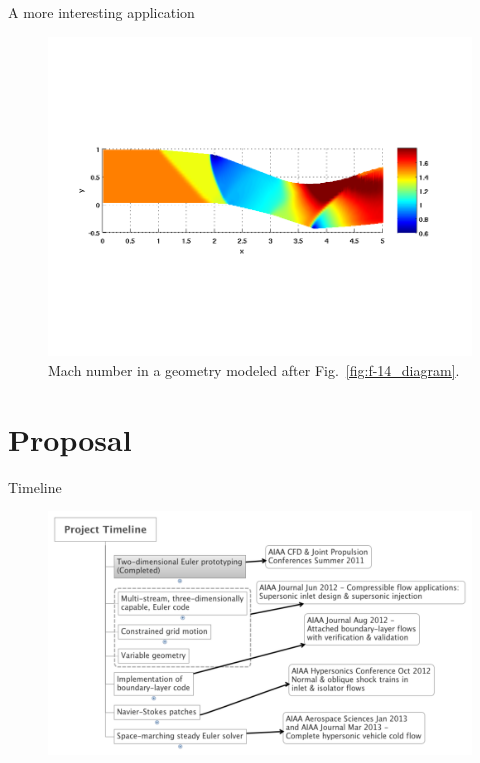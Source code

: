\documentclass{beamer}
\begin{document}
\begin{frame}{A more interesting application}
\begin{figure}[htbp]
   \centering
   \includegraphics[width=\textwidth]{F_14_filmstrip_5clean.pdf}
   \caption[Mach Number in F-14 Inlet]{Mach number in a geometry modeled after Fig.~\ref{fig:f-14_diagram}.}
   \label{fig:f-14_flow}
\end{figure}
\end{frame}

\section{Proposal}

\begin{frame}{Timeline}
  \begin{figure}
    \includegraphics[width=\textwidth]{Timeline.pdf}
  \end{figure}
\end{frame}
\end{document}
